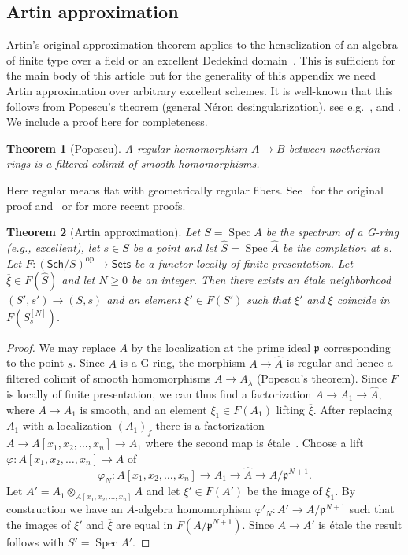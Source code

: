\documentclass[a4paper]{amsart}
\theoremstyle{plain}
\newtheorem{theorem}{Theorem}[section]
\theoremstyle{definition}
\theoremstyle{remark}
\numberwithin{equation}{section}
\newcommand{\idp}{\mathfrak{p}} %
\newcommand{\op}{\mathrm{op}} %
\DeclareMathOperator{\Spec}{Spec}
\newcommand\Sets{\mathsf{Sets}}
\newcommand{\Sch}{\mathsf{Sch}}
\newcommand{\spref}[1]{\href{http://stacks.math.columbia.edu/tag/#1}{#1}}
\begin{document}

\subsection{Artin approximation}
Artin's original approximation theorem applies to the henselization of an
algebra of finite type over a field or an excellent Dedekind
domain~\cite[Thm.~1.12]{artin-approx}. This is sufficient for the main body of
this article but for the generality of this appendix we need Artin approximation
over arbitrary excellent schemes. It is well-known that this follows from
Popescu's theorem (general N\'eron desingularization), see
e.g.\ \cite[Thm.~1.3]{popescu-general}, \cite[Thm.~11.3]{spivakovsky_popescus_theorem} and \cite[Tag
\spref{07QY}]{stacks-project}. We include a proof here for completeness.

\begin{theorem}[Popescu]
A regular homomorphism $A\to B$ between noetherian rings is a
filtered colimit of smooth homomorphisms.
\end{theorem}

Here regular means flat with geometrically regular fibers.
See~\cite[Thm.~1.8]{popescu-general} for the original proof and~\cite{swan_popescus_theorem,spivakovsky_popescus_theorem} or \cite[Tag \spref{07BW}]{stacks-project} for more recent proofs.

\begin{theorem}[Artin approximation]\label{T:artin-approximation}
Let $S=\Spec A$ be the spectrum of a G-ring (e.g., excellent), let $s\in S$ be
a point and let $\widehat{S}=\Spec \widehat{A}$ be the completion at $s$.  Let
$F\colon (\Sch/S)^\op\to \Sets$ be a functor locally of finite
presentation. Let $\overline{\xi}\in F(\widehat{S})$ and let $N\geq 0$ be an
integer. Then there exists an \'etale neighborhood $(S',s')\to (S,s)$ and an
element $\xi'\in F(S')$ such that $\xi'$ and $\overline{\xi}$ coincide in
$F(S^{[N]}_s)$.
\end{theorem}
\begin{proof}
We may replace $A$ by the localization at the prime ideal $\idp$ corresponding
to the point $s$. Since $A$ is a G-ring, the morphism $A\to \widehat{A}$ is
regular and hence a filtered colimit of smooth homomorphisms $A\to A_\lambda$
(Popescu's theorem). Since $F$ is locally of finite presentation, we can thus
find a factorization $A\to A_1\to \widehat{A}$, where $A\to A_1$ is smooth, and
an element $\xi_1\in F(A_1)$ lifting $\overline{\xi}$. After replacing $A_1$ with a
localization $(A_1)_f$ there is a factorization $A\to A[x_1,x_2,\dots,x_n]\to
A_1$ where the second map is \'etale~\cite[IV.17.11.4]{EGA}. Choose a lift
$\varphi\colon A[x_1,x_2,\dots,x_n]\to A$ of
\[
\varphi_N\colon A[x_1,x_2,\dots,x_n]\to A_1\to \widehat{A}\to A/\idp^{N+1}.
\]
Let $A'=A_1\otimes_{A[x_1,x_2,\dots,x_n]} A$ and
let $\xi'\in F(A')$ be the image of $\xi_1$. By construction we have an
$A$-algebra homomorphism $\varphi'_N\colon A'\to A/\idp^{N+1}$ such that the
images of $\xi'$ and $\overline{\xi}$ are equal in $F(A/\idp^{N+1})$.  Since $A\to
A'$ is \'etale the result follows with $S'=\Spec A'$.
\end{proof}
\end{document}
